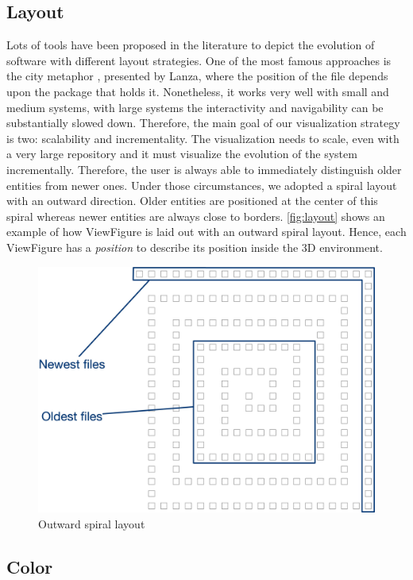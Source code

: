 \subsection*{Layout}
Lots of tools have been proposed in the literature to depict the evolution of software with different layout strategies. 
One of the most famous approaches is the city metaphor \cite{Wettel2007}, presented by Lanza, where the position of the file depends upon the package that holds it. 
Nonetheless, it works very well with small and medium systems, with large systems the interactivity and navigability can be substantially slowed down.
\bigbreak
Therefore, the main goal of our visualization strategy is two: scalability and incrementality. The visualization needs to scale, even with a very large repository and it must visualize the evolution of the system incrementally. Therefore, the user is always able to immediately distinguish older entities from newer ones.
\bigbreak
Under those circumstances, we adopted a spiral layout with an outward direction. Older entities are positioned at the center of this spiral whereas newer entities are always close to borders. 
\autoref{fig:layout} shows an example of how ViewFigure is laid out with an outward spiral layout.
\bigbreak
Hence, each ViewFigure has a \textit{position} to describe its position inside the 3D environment. 

\begin{figure}
    \center
    \includegraphics[width=\textwidth]{SpiralLayout.jpg}
    \caption{Outward spiral layout}
    \label{fig:layout}
\end{figure}

\subsection*{Color}

